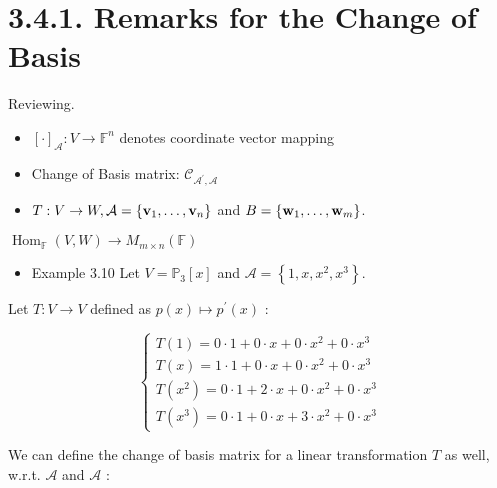 \documentclass[11pt]{article}
\begin{document}
\section*{3.4.1. Remarks for the Change of Basis}

Reviewing.

\begin{itemize}
\item \({\left\lbrack  \cdot \right\rbrack  }_{\mathcal{A}} : V \rightarrow  {\mathbb{F}}^n\) denotes coordinate vector mapping
\end{itemize}

\begin{itemize}
\item Change of Basis matrix: \({\mathcal{C}}_{{\mathcal{A}}^{\prime },\mathcal{A}}\)
\end{itemize}

\begin{itemize}
\item \(T : V \rightarrow  W,\mathcal{A} = \left\{  {{\bf v}_1,\ldots ,{\bf v}_n}\right\}\) and \(B = \left\{  {{\bf w}_1,\ldots ,{\bf w}_{m}}\right\}\).
\end{itemize}

\({\operatorname{Hom}}_{\mathbb{F}}\left( {V,W}\right)  \rightarrow  {M}_{m \times  n}\left( \mathbb{F}\right)\)

\begin{itemize}
\item Example 3.10 Let \(V = {\mathbb{P}}_{3}\left\lbrack  x\right\rbrack\) and \(\mathcal{A} = \left\{  {1,x,{x}^2,{x}^{3}}\right\}\).
\end{itemize}

Let \(T : V \rightarrow  V\) defined as \(p\left( x\right)  \mapsto  {p}^{\prime }\left( x\right)\) :

\[
\left\{  \begin{array}{l} T\left( 1\right)  = 0 \cdot  1 + 0 \cdot  x + 0 \cdot  {x}^2 + 0 \cdot  {x}^{3} \\  T\left( x\right)  = 1 \cdot  1 + 0 \cdot  x + 0 \cdot  {x}^2 + 0 \cdot  {x}^{3} \\  T\left( {x}^2\right)  = 0 \cdot  1 + 2 \cdot  x + 0 \cdot  {x}^2 + 0 \cdot  {x}^{3} \\  T\left( {x}^{3}\right)  = 0 \cdot  1 + 0 \cdot  x + 3 \cdot  {x}^2 + 0 \cdot  {x}^{3} \end{array}\right.
\]

We can define the change of basis matrix for a linear transformation \(T\) as well, w.r.t. \(\mathcal{A}\) and \(\mathcal{A}\) :
\end{document}

